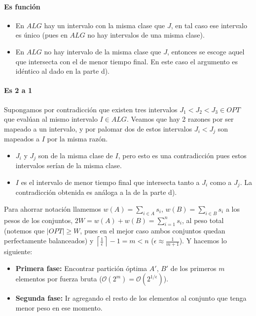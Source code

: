 \documentclass[dcc,uchile]{fcfmcourse}
\theoremstyle{plain}
\theoremstyle{definition}
\begin{document}
\begin{problems}
\begin{enumerate}[a)]
    \paragraph{Es función}
    \begin{itemize}
        \item En $ALG$ hay un intervalo con la misma clase que $J$, en tal caso ese intervalo es único (pues en $ALG$ no hay intervalos de una misma clase).
        \item En $ALG$ no hay intervalo de la misma clase que $J$, entonces se escoge aquel que intersecta con el de menor tiempo final. En este caso el argumento es idéntico al dado en la parte d).
    \end{itemize}
    
    \paragraph{Es 2 a 1} Supongamos por contradicción que existen tres intervalos $J_{1} < J_2 < J_3 \in OPT$ que evalúan al mismo intervalo $I \in ALG$. Veamos que hay 2 razones por ser mapeado a un intervalo, y por palomar dos de estos intervalos $J_{i} < J_{j}$ son mapeados a $I$ por la misma razón.
    \begin{itemize}
        \item $J_{i}$ y $J_{j}$ son de la misma clase de $I$, pero esto es una contradicción pues estos intervalos serían de la misma clase.
        \item $I$ es el intervalo de menor tiempo final que intersecta tanto a $J_{i}$ como a $J_{j}$. La contradicción obtenida es análoga a la de la parte d).
    \end{itemize}
\end{enumerate}
\problem Para ahorrar notación llamemos $w(A) = \sum_{i \in A}s_{i}$, $w(B) = \sum_{i \in B}s_{i}$ a los pesos de los conjuntos, $2W = w(A) + w(B) = \sum_{i = 1}^{n}s_{i}$, al peso total (notemos que $|OPT| \ge W$, pues en el mejor caso ambos conjuntos quedan perfectamente balanceados) y $\left\lceil\frac{1}{\epsilon}\right\rceil-1 = m < n$ ($\epsilon \approx \frac{1}{m+1}$). Y hacemos lo siguiente:
\begin{itemize}
    \item \textbf{Primera fase:} Encontrar partición óptima $A'$, $B'$ de los primeros $m$ elementos por fuerza bruta ($\mathcal{O}(2^m) = \mathcal{O}(2^{1/\epsilon})$).
    \item \textbf{Segunda fase:} Ir agregando el resto de los elementos al conjunto que tenga menor peso en ese momento.

\end{itemize}
\end{problems}
\end{document}
